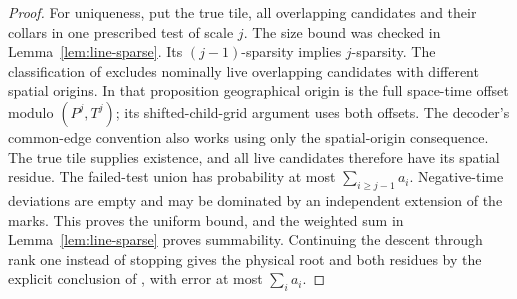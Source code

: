 \begin{proof}
For uniqueness, put the true tile, all overlapping candidates and
their collars in one prescribed test of scale $j$. The size bound was
checked in Lemma~\ref{lem:line-sparse}. Its $(j-1)$-sparsity implies
$j$-sparsity. The classification of \cite[Proposition~5.3(i)]{DMline}
excludes nominally live overlapping candidates with different spatial
origins. In that proposition geographical origin is the full space-time
offset modulo $(P^j,T^j)$; its shifted-child-grid argument uses both
offsets. The decoder's common-edge convention also works using only
the spatial-origin consequence. The true tile supplies existence,
and all live candidates therefore have its spatial residue.
The failed-test union has probability at most
$\sum_{i\ge j-1}a_i$. Negative-time deviations are empty and may be
dominated by an independent extension of the marks. This proves the
uniform bound, and the weighted sum in Lemma~\ref{lem:line-sparse}
proves summability. Continuing the descent through rank one instead
of stopping gives the physical root and both residues by the explicit
conclusion of \cite[Lemma~5.24]{DMline}, with error at most $\sum_i a_i$.
\end{proof}

